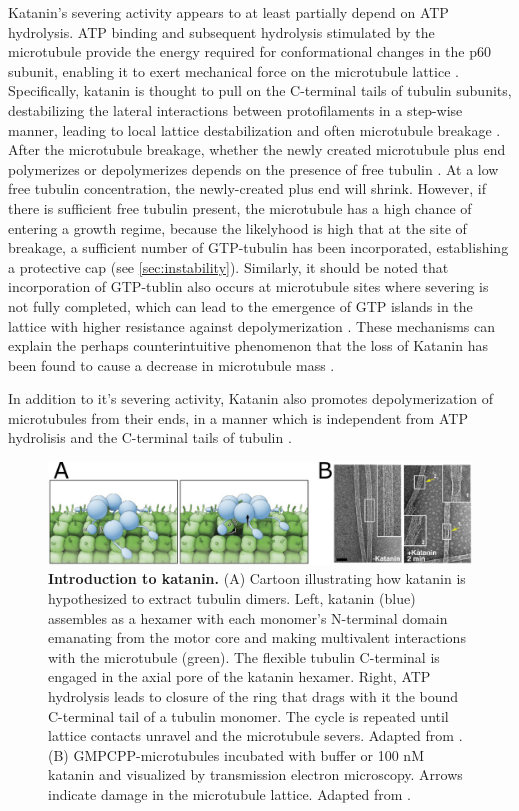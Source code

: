 Katanin's severing activity appears to at least partially depend on ATP hydrolysis. ATP binding and subsequent hydrolysis stimulated by the microtubule provide the energy required for conformational changes in the p60 subunit, enabling it to exert mechanical force on the microtubule lattice \parencite{Zehr2017}. Specifically, katanin is thought to pull on the C-terminal tails of tubulin subunits, destabilizing the lateral interactions between protofilaments in a step-wise manner, leading to local lattice destabilization and often microtubule breakage . After the microtubule breakage, whether the newly created microtubule plus end polymerizes or depolymerizes depends on the presence of free tubulin \parencite{Vemu2018, Kuo2021}. At a low free tubulin concentration, the newly-created plus end will shrink. However, if there is sufficient free tubulin present, the microtubule has a high chance of entering a growth regime, because the likelyhood is high that at the site of breakage, a sufficient number of GTP-tubulin has been incorporated, establishing a protective cap (see \autoref{sec:instability}). Similarly, it should be noted that incorporation of GTP-tublin also occurs at microtubule sites where severing is not fully completed, which can lead to the emergence of GTP islands in the lattice with higher resistance against depolymerization \parencite{Vemu2018}. These mechanisms can explain the perhaps counterintuitive phenomenon that the loss of Katanin has been found to cause a decrease in microtubule mass \parencite{Vemu2018}. 
\par
In addition to it's severing activity, Katanin also promotes depolymerization of microtubules from their ends, in a manner which is independent from ATP hydrolisis and the C-terminal tails of tubulin \parencite{Belonogov2019}.

\begin{figure}[h!tb]
\centering
\includegraphics[width=\linewidth]{Figures/katanin.png}
\caption[Introduction to katanin.]{\textbf{Introduction to katanin.}
(A) Cartoon illustrating how katanin is hypothesized to extract tubulin dimers. Left, katanin (blue) assembles as a hexamer with each monomer's N-terminal domain emanating from the motor core and making multivalent interactions with the microtubule (green). The flexible tubulin C-terminal is engaged in the axial pore of the katanin hexamer. Right, ATP hydrolysis leads to closure of the ring that drags with it the bound C-terminal tail of a tubulin monomer. The cycle is repeated until lattice contacts unravel and the microtubule severs. Adapted from \cite{Zehr2017}. (B) GMPCPP-microtubules incubated with buffer or 100 nM katanin and visualized by transmission electron microscopy. Arrows indicate damage in the microtubule lattice. Adapted from \cite{Grigorieff2018}.
	}\label{katanin}
\end{figure}

